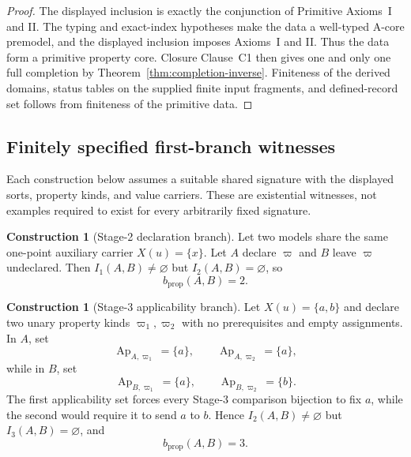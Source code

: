 \documentclass[11pt]{article}
\newcommand{\Ap}{\operatorname{Ap}}
\theoremstyle{definition}
\newtheorem{construction}[theorem]{Construction}
\theoremstyle{remark}
\begin{document}
\begin{proof}
The displayed inclusion is exactly the conjunction of Primitive Axioms~I and II.
The typing and exact-index hypotheses make the data a well-typed A-core premodel, and the displayed inclusion imposes Axioms~I and II. Thus the data form a primitive property core.
Closure Clause~C1 then gives one and only one full completion by Theorem~\ref{thm:completion-inverse}.
Finiteness of the derived domains, status tables on the supplied finite input fragments, and defined-record set follows from finiteness of the primitive data.
\end{proof}

\subsection{Finitely specified first-branch witnesses}

Each construction below assumes a suitable shared signature with
the displayed sorts, property kinds, and value carriers. These are
existential witnesses, not examples required to exist for every
arbitrarily fixed signature.

\begin{construction}[Stage-2 declaration branch]
Let two models share the same one-point auxiliary carrier \(X(u)=\{x\}\).
Let \(A\) declare \(\varpi\) and \(B\) leave \(\varpi\) undeclared.
Then \(I_1(A,B)\neq\varnothing\) but \(I_2(A,B)=\varnothing\), so
\[
b_{\mathrm{prop}}(A,B)=2.
\]
\end{construction}

\begin{construction}[Stage-3 applicability branch]
Let \(X(u)=\{a,b\}\) and declare two unary property kinds \(\varpi_1,\varpi_2\) with no prerequisites and empty assignments.
In \(A\), set
\[
\Ap_{A,\varpi_1}=\{a\},
\qquad
\Ap_{A,\varpi_2}=\{a\},
\]
while in \(B\), set
\[
\Ap_{B,\varpi_1}=\{a\},
\qquad
\Ap_{B,\varpi_2}=\{b\}.
\]
The first applicability set forces every Stage-3 comparison bijection to fix \(a\), while the second would require it to send \(a\) to \(b\).
Hence \(I_2(A,B)\neq\varnothing\) but \(I_3(A,B)=\varnothing\), and
\[
b_{\mathrm{prop}}(A,B)=3.
\]
\end{construction}
\end{document}
